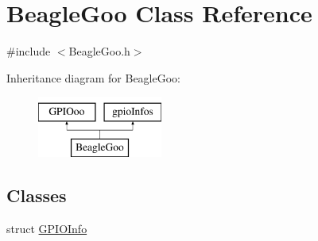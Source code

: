 \hypertarget{struct_beagle_goo}{\section{Beagle\-Goo Class Reference}
\label{struct_beagle_goo}
}


{\ttfamily \#include $<$Beagle\-Goo.\-h$>$}

Inheritance diagram for Beagle\-Goo\-:\begin{figure}[H]
\begin{center}
\leavevmode
\includegraphics[height=2.000000cm]{struct_beagle_goo}
\end{center}
\end{figure}
\subsection*{Classes}
\begin{DoxyCompactItemize}
\item 
struct \hyperlink{struct_beagle_goo_1_1_g_p_i_o_info}{G\-P\-I\-O\-Info}
\end{DoxyCompactItemize}
